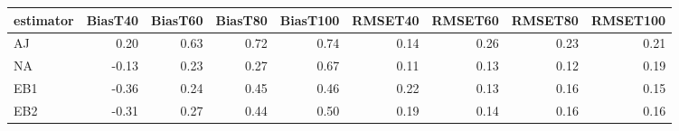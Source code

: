 \begin{table}[ht]
\centering
\begin{tabular}{lrrrrrrrr}
  \toprule
estimator & BiasT40 & BiasT60 & BiasT80 & BiasT100 & RMSET40 & RMSET60 & RMSET80 & RMSET100 \\ 
  \midrule
AJ & 0.20 & 0.63 & 0.72 & 0.74 & 0.14 & 0.26 & 0.23 & 0.21 \\ 
  NA & -0.13 & 0.23 & 0.27 & 0.67 & 0.11 & 0.13 & 0.12 & 0.19 \\ 
  EB1 & -0.36 & 0.24 & 0.45 & 0.46 & 0.22 & 0.13 & 0.16 & 0.15 \\ 
  EB2 & -0.31 & 0.27 & 0.44 & 0.50 & 0.19 & 0.14 & 0.16 & 0.16 \\ 
   \bottomrule
\end{tabular}
\end{table}
